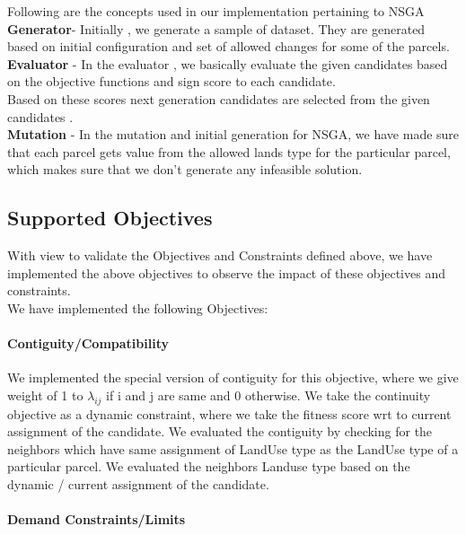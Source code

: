 \documentclass[12pt]{article} %
\begin{document}
Following are the concepts used in our implementation pertaining to NSGA\\[.10cm]
\textbf{Generator}- Initially , we generate a sample of dataset. They are generated based on initial configuration and set of allowed changes for some of the parcels. \\[.15cm]
\textbf{Evaluator }- In the evaluator , we basically evaluate the  given candidates based on the objective functions and sign score to each candidate.\\
Based on these scores next generation candidates are selected from the given candidates . \\ [.15cm]
\textbf{Mutation }- In the mutation and initial generation for NSGA, we have made sure that each parcel gets value from the allowed lands type for the particular parcel, which makes sure that we don't generate any infeasible solution.\\[.35cm]


\subsection{Supported Objectives}

With view to validate the Objectives and Constraints defined above, we have implemented the above objectives to observe the impact  of these objectives and constraints.\\[.25cm]

We have implemented the following Objectives:

\paragraph*{Contiguity/Compatibility}

We implemented the special version of contiguity for this objective, where we give weight of 1 to $\lambda_{ij}$ if i and j are same and 0 otherwise.
We  take the continuity objective as a dynamic constraint, where we take the fitness score wrt to current assignment of the candidate. We evaluated the contiguity by checking for the neighbors which have same assignment of LandUse type as the LandUse type of a particular parcel. We evaluated the neighbors Landuse type based  on the dynamic / current assignment of the candidate.

\paragraph*{Demand Constraints/Limits}
\end{document}

